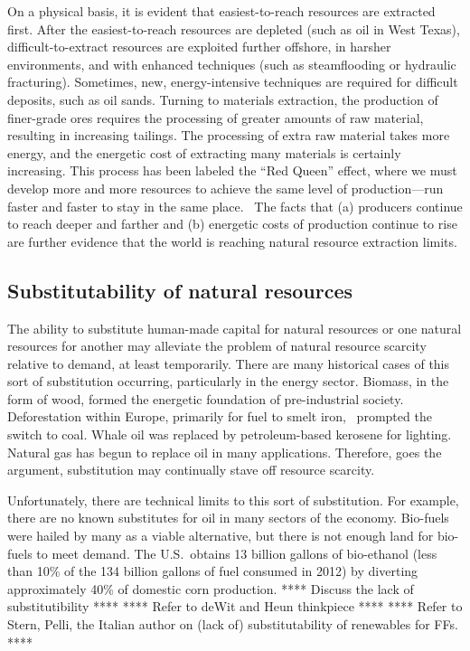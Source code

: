 On a physical basis, 
it is evident that easiest-to-reach resources are extracted first. 
After the easiest-to-reach resources are depleted (such as oil in West Texas),
difficult-to-extract resources are exploited
further offshore,
in harsher environments, and
with enhanced techniques (such as steamflooding or hydraulic fracturing).
Sometimes, new, energy-intensive techniques are required 
for difficult deposits, such as oil sands.
Turning to materials extraction, the production of finer-grade ores
requires the processing of greater amounts of raw material, 
resulting in increasing tailings.
The processing of extra raw material takes more energy, and 
the energetic cost of extracting many materials is certainly increasing.\cite{Hall1986, Mudd2010,Hall2011}
This process has been labeled the ``Red Queen'' effect, 
where we must develop more and more resources to achieve the same
level of production---run faster and faster to stay in 
the same place.~\cite{Lees1975, Ross1988, Murray2013, Murphy2014}
The facts that (a) producers continue to reach deeper and farther 
and (b) energetic costs of production continue to rise
are further evidence that the world is reaching natural resource extraction limits.


\subsection{Substitutability of natural resources}

The ability to substitute human-made capital for natural resources
or one natural resources for another 
may alleviate the problem of natural resource scarcity relative to demand,
at least temporarily.
There are many historical cases of this sort of substitution occurring,
particularly in the energy sector.
Biomass, in the form of wood,
formed the energetic foundation of pre-industrial society.
Deforestation within Europe,
primarily for fuel to smelt iron,~\cite{Smil1994}
prompted the switch to coal.
Whale oil was replaced by petroleum-based kerosene for lighting.\cite{Weissenbacher2009}
Natural gas has begun to replace oil in many applications.
Therefore, goes the argument, 
substitution may continually stave off resource scarcity.

Unfortunately, there are technical limits to this sort of substitution.
For example, there are no known substitutes for oil 
in many sectors of the economy.\cite{Hirsch2005}
Bio-fuels were hailed by many as a viable alternative,
but there is not enough land for bio-fuels to meet demand.
The U.S.\ obtains 13 billion gallons of bio-ethanol 
(less than 10\% of the 134 billion gallons of fuel consumed in 2012)
by diverting approximately 40\%
of domestic corn production.\cite{EIA2014, USDA2014}
**** Discuss the lack of substitutibility **** 
**** Refer to deWit and Heun thinkpiece ****
**** Refer to Stern, Pelli, the Italian author on (lack of) 
substitutability of renewables for FFs. ****

